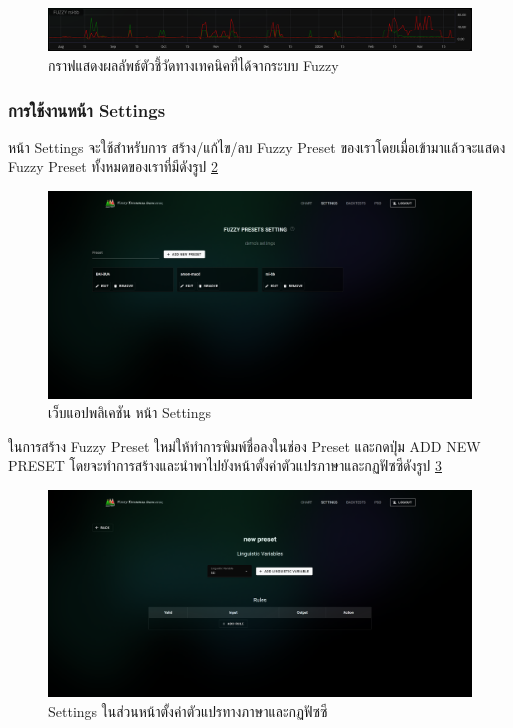 \begin{figure}[h]
    \centering
    \includegraphics[width=\textwidth]{images/web-tuts/chart-fuzzy-on.PNG}
    \caption{กราฟแสดงผลลัพธ์ตัวชี้วัดทางเทคนิคที่ได้จากระบบ Fuzzy}
    \label{fig:chart-fuzzy-on}
\end{figure}
\FloatBarrier

\subsubsection{การใช้งานหน้า Settings}
หน้า Settings จะใช้สำหรับการ สร้าง/แก้ไข/ลบ Fuzzy Preset ของเราโดยเมื่อเข้ามาแล้วจะแสดง Fuzzy Preset ทั้งหมดของเราที่มีดังรูป \ref{fig:settings-presets}
\begin{figure}[ht]
    \centering
    \includegraphics[width=\textwidth]{images/web-tuts/settings-presets.PNG}
    \caption{เว็บแอปพลิเคชัน หน้า Settings}
    \label{fig:settings-presets}
\end{figure}
\FloatBarrier
ในการสร้าง Fuzzy Preset ใหม่ให้ทำการพิมพ์ชื่อลงในช่อง Preset และกดปุ่ม ADD NEW PRESET โดยจะทำการสร้างและนำพาไปยังหน้าตั้งค่าตัวแปรภาษาและกฏฟัซซีดังรูป \ref{fig:settings-new-preset}
\begin{figure}[ht]
    \centering
    \includegraphics[width=\textwidth]{images/web-tuts/settings-new-preset.PNG}
    \caption{Settings ในส่วนหน้าตั้งค่าตัวแปรทางภาษาและกฏฟัซซี}
    \label{fig:settings-new-preset}
\end{figure}
